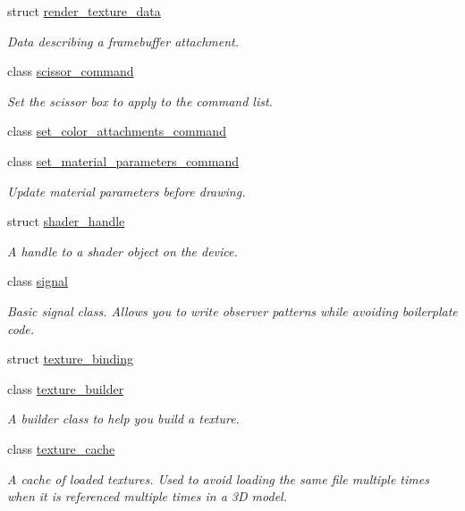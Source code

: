 \begin{DoxyCompactItemize}
struct \mbox{\hyperlink{structmoka_1_1render__texture__data}{render\+\_\+texture\+\_\+data}}
\begin{DoxyCompactList}\small\item\em Data describing a framebuffer attachment. \end{DoxyCompactList}\item 
class \mbox{\hyperlink{classmoka_1_1scissor__command}{scissor\+\_\+command}}
\begin{DoxyCompactList}\small\item\em Set the scissor box to apply to the command list. \end{DoxyCompactList}\item 
class \mbox{\hyperlink{classmoka_1_1set__color__attachments__command}{set\+\_\+color\+\_\+attachments\+\_\+command}}
\item 
class \mbox{\hyperlink{classmoka_1_1set__material__parameters__command}{set\+\_\+material\+\_\+parameters\+\_\+command}}
\begin{DoxyCompactList}\small\item\em Update material parameters before drawing. \end{DoxyCompactList}\item 
struct \mbox{\hyperlink{structmoka_1_1shader__handle}{shader\+\_\+handle}}
\begin{DoxyCompactList}\small\item\em A handle to a shader object on the device. \end{DoxyCompactList}\item 
class \mbox{\hyperlink{classmoka_1_1signal}{signal}}
\begin{DoxyCompactList}\small\item\em Basic signal class. Allows you to write observer patterns while avoiding boilerplate code. \end{DoxyCompactList}\item 
struct \mbox{\hyperlink{structmoka_1_1texture__binding}{texture\+\_\+binding}}
\item 
class \mbox{\hyperlink{classmoka_1_1texture__builder}{texture\+\_\+builder}}
\begin{DoxyCompactList}\small\item\em A builder class to help you build a texture. \end{DoxyCompactList}\item 
class \mbox{\hyperlink{classmoka_1_1texture__cache}{texture\+\_\+cache}}
\begin{DoxyCompactList}\small\item\em A cache of loaded textures. Used to avoid loading the same file multiple times when it is referenced multiple times in a 3D model. \end{DoxyCompactList}\item 

\end{DoxyCompactItemize}
